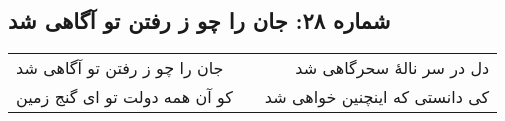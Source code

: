 \begin{center}
\section*{شماره ۲۸: جان را چو ز رفتن تو آگاهی شد}
\label{sec:028}
\begin{longtable}{l p{0.5cm} r}
جان را چو ز رفتن تو آگاهی شد
&&
دل در سر نالهٔ سحرگاهی شد
\\
کو آن همه دولت تو ای گنج زمین
&&
کی دانستی که اینچنین خواهی شد
\\
\end{longtable}
\end{center}
